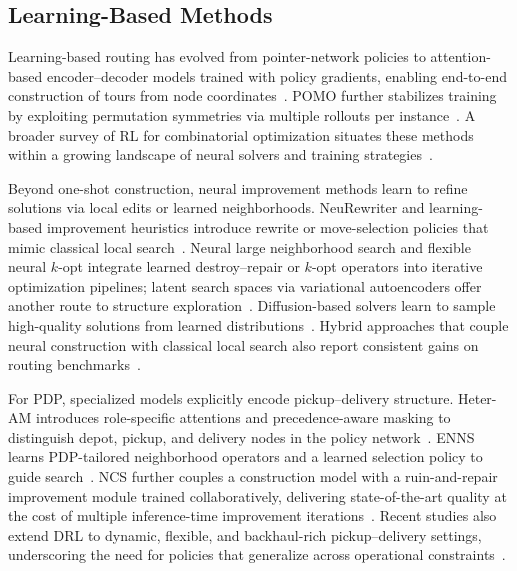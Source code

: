 \documentclass[pdflatex,sn-basic,Numbered]{sn-jnl}
\begin{document}
\subsection{Learning-Based Methods}

Learning-based routing has evolved from pointer-network policies to attention-based encoder--decoder models trained with policy gradients, enabling end-to-end construction of tours from node coordinates~\cite{vinyals2015pointer,bello2016nco,nazari2018rl4vrp,kool2019attention}. POMO further stabilizes training by exploiting permutation symmetries via multiple rollouts per instance~\cite{kwon2020pomo}. A broader survey of RL for combinatorial optimization situates these methods within a growing landscape of neural solvers and training strategies~\cite{mazyavkina2021survey}.

Beyond one-shot construction, neural improvement methods learn to refine solutions via local edits or learned neighborhoods. NeuRewriter and learning-based improvement heuristics introduce rewrite or move-selection policies that mimic classical local search~\cite{chen2019neurewriter,wu2022improvement}. Neural large neighborhood search and flexible neural $k$-opt integrate learned destroy--repair or $k$-opt operators into iterative optimization pipelines; latent search spaces via variational autoencoders offer another route to structure exploration~\cite{hottung2022nlns,ma2023neuopt,hottung2021vae}. Diffusion-based solvers learn to sample high-quality solutions from learned distributions~\cite{sun2024difusco}. Hybrid approaches that couple neural construction with classical local search also report consistent gains on routing benchmarks~\cite{zhao2021hybrid}.

For PDP, specialized models explicitly encode pickup--delivery structure. Heter-AM introduces role-specific attentions and precedence-aware masking to distinguish depot, pickup, and delivery nodes in the policy network~\cite{li2022heter}. ENNS learns PDP-tailored neighborhood operators and a learned selection policy to guide search~\cite{ma2021enns}. NCS further couples a construction model with a ruin-and-repair improvement module trained collaboratively, delivering state-of-the-art quality at the cost of multiple inference-time improvement iterations~\cite{kong2024ncs}. Recent studies also extend DRL to dynamic, flexible, and backhaul-rich pickup--delivery settings, underscoring the need for policies that generalize across operational constraints~\cite{xiang2024crowdshippers,tian2025flexible,wang2025backhauls}.
\end{document}
